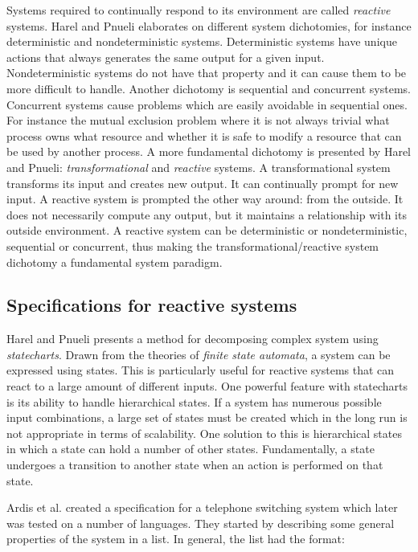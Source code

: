 Systems required to continually respond to its environment are called
\textit{reactive} systems. Harel and Pnueli elaborates on different system
dichotomies, for instance deterministic and nondeterministic systems.
Deterministic systems have unique actions that always generates the same output
for a given input. Nondeterministic systems do not have that property and it
can cause them to be more difficult to handle.  Another dichotomy is sequential
and concurrent systems. Concurrent systems cause problems which are easily
avoidable in sequential ones. For instance the mutual exclusion problem where
it is not always trivial what process owns what resource and whether it is safe
to modify a resource that can be used by another process. A more fundamental
dichotomy is presented by Harel and Pnueli: \textit{transformational} and
\textit{reactive} systems. A transformational system transforms its input and
creates new output. It can continually prompt for new input. A reactive system
is prompted the other way around: from the outside. It does not necessarily
compute any output, but it maintains a relationship with its outside
environment. A reactive system can be deterministic or nondeterministic,
sequential or concurrent, thus making the transformational/reactive system
dichotomy a fundamental system paradigm. \cite{harel1985development}

\subsection{Specifications for reactive systems}

Harel and Pnueli presents a method for decomposing complex system using
\textit{statecharts}. Drawn from the theories of \textit{finite state
automata}, a system can be expressed using states. This is particularly useful
for reactive systems that can react to a large amount of different inputs. One
powerful feature with statecharts is its ability to handle hierarchical states.
If a system has numerous possible input combinations, a large set of states
must be created which in the long run is not appropriate in terms of
scalability. One solution to this is hierarchical states in which a state can
hold a number of other states. Fundamentally, a state undergoes a transition to
another state when an action is performed on that state.
\cite{harel1985development}

Ardis et al. \cite{ardis1996framework} created a specification for a telephone
switching system which later was tested on a number of languages. They started
by describing some general properties of the system in a list. In general, the
list had the format:

